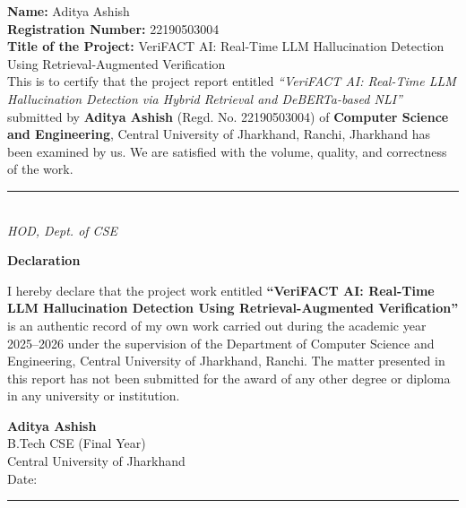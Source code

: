 \documentclass[12pt, a4paper, oneside]{report}
\begin{document}
\noindent
\textbf{Name:} Aditya Ashish\\
\textbf{Registration Number:} 22190503004\\
\textbf{Title of the Project:} VeriFACT AI: Real-Time LLM Hallucination Detection Using Retrieval-Augmented Verification\\[0.8cm]

\noindent
This is to certify that the project report entitled
\textit{``VeriFACT AI: Real-Time LLM Hallucination Detection via Hybrid Retrieval and DeBERTa-based NLI''}
submitted by \textbf{Aditya Ashish} (Regd. No. 22190503004) of
\textbf{Computer Science and Engineering}, Central University of Jharkhand, Ranchi, Jharkhand
has been examined by us. We are satisfied with the volume, quality, and correctness of the work.\\[2cm]

\noindent
\begin{flushright}
\begin{minipage}{6cm}
\rule{\linewidth}{0.4pt}\\
\centering \textit{HOD, Dept. of CSE}
\end{minipage}
\end{flushright}





\clearpage
\newpage
\thispagestyle{empty}
\begin{center}
{\Large\bfseries Declaration}\\[1cm]
\end{center}

I hereby declare that the project work entitled \textbf{``VeriFACT AI: Real-Time LLM Hallucination Detection Using Retrieval-Augmented Verification''} is an authentic record of my own work carried out during the academic year 2025--2026 under the supervision of the Department of Computer Science and Engineering, Central University of Jharkhand, Ranchi. The matter presented in this report has not been submitted for the award of any other degree or diploma in any university or institution.

\vspace{2cm}

\noindent
\begin{flushright}
\textbf{Aditya Ashish}\\
B.Tech CSE (Final Year)\\
Central University of Jharkhand\\[1cm]
Date: \rule{3cm}{0.4pt}
\end{flushright}
\end{document}
